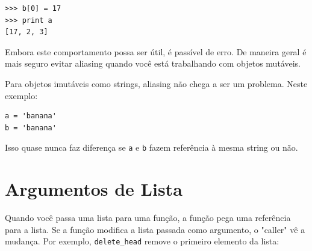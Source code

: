 
\beforeverb
\begin{verbatim}
>>> b[0] = 17
>>> print a
[17, 2, 3]
\end{verbatim}
\afterverb
%
Embora este comportamento possa ser útil, é passível de erro. De maneira
geral é mais seguro evitar aliasing quando você está trabalhando com objetos mutáveis.




Para objetos imutáveis como strings, aliasing não chega a ser um problema. 
Neste exemplo:



\beforeverb
\begin{verbatim}
a = 'banana'
b = 'banana'
\end{verbatim}
\afterverb
%
Isso quase nunca faz diferença se {\tt a} e {\tt b} fazem referência à mesma string ou não.




\section{Argumentos de Lista}




Quando você passa uma lista para uma função, a função pega uma referência para a lista.
Se a função modifica a lista passada como argumento, o "caller" vê a mudança.
Por exemplo, \verb"delete_head" remove o primeiro elemento da lista:



